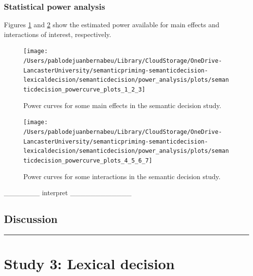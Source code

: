 \documentclass[
  12pt,
  man,floatsintext]{apa7}
\begin{document}
\hypertarget{statistical-power-analysis-1}{%
\subsubsection{Statistical power analysis}\label{statistical-power-analysis-1}}

Figures \ref{fig:semanticdecision-powercurve-plots-1-2-3} and \ref{fig:semanticdecision-powercurve-plots-4-5-6-7} show the estimated power available for main effects and interactions of interest, respectively.

\begin{figure}

{\centering \texttt{[image: /Users/pablodejuanbernabeu/Library/CloudStorage/OneDrive-LancasterUniversity/semanticpriming-semanticdecision-lexicaldecision/semanticdecision/power\_analysis/plots/semanticdecision\_powercurve\_plots\_1\_2\_3]} 

}

\caption{Power curves for some main effects in the semantic decision study.}\label{fig:semanticdecision-powercurve-plots-1-2-3}
\end{figure}

\begin{figure}

{\centering \texttt{[image: /Users/pablodejuanbernabeu/Library/CloudStorage/OneDrive-LancasterUniversity/semanticpriming-semanticdecision-lexicaldecision/semanticdecision/power\_analysis/plots/semanticdecision\_powercurve\_plots\_4\_5\_6\_7]} 

}

\caption{Power curves for some interactions in the semantic decision study.}\label{fig:semanticdecision-powercurve-plots-4-5-6-7}
\end{figure}

\_\_\_\_\_\_\_ interpret \_\_\_\_\_\_\_\_\_\_\_\_

\hypertarget{discussion-1}{%
\subsection{Discussion}\label{discussion-1}}

\begin{center}\rule{0.5\linewidth}{0.5pt}\end{center}

\clearpage

\hypertarget{study-3-lexical-decision}{%
\section{Study 3: Lexical decision}\label{study-3-lexical-decision}}
\end{document}
